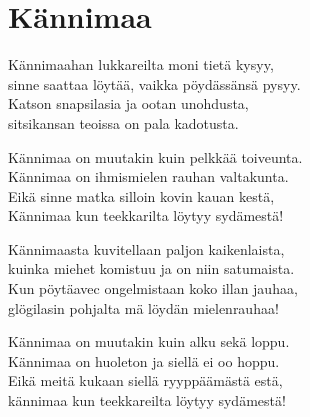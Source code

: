 \section{Kännimaa}

Kännimaahan lukkareilta moni tietä kysyy,\\
sinne saattaa löytää, vaikka pöydässänsä pysyy.\\
Katson snapsilasia ja ootan unohdusta,\\
sitsikansan teoissa on pala kadotusta.

Kännimaa on muutakin kuin pelkkää toiveunta.\\
Kännimaa on ihmismielen rauhan valtakunta.\\
Eikä sinne matka silloin kovin kauan kestä,\\
Kännimaa kun teekkarilta löytyy sydämestä!

Kännimaasta kuvitellaan paljon kaikenlaista,\\
kuinka miehet komistuu ja on niin satumaista.\\
Kun pöytäavec ongelmistaan koko illan jauhaa,\\
glögilasin pohjalta mä löydän mielenrauhaa!

Kännimaa on muutakin kuin alku sekä loppu.\\
Kännimaa on huoleton ja siellä ei oo hoppu.\\
Eikä meitä kukaan siellä ryyppäämästä estä,\\
kännimaa kun teekkareilta löytyy sydämestä!